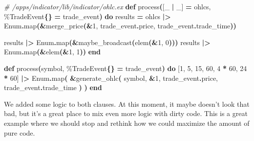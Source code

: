 \documentclass[
  oneside]{book}
\newenvironment{Shaded}{\begin{snugshade}}{\end{snugshade}}
\newcommand{\CommentTok}[1]{\textcolor[rgb]{0.56,0.35,0.01}{\textit{#1}}}
\newcommand{\ConstantTok}[1]{\textcolor[rgb]{0.56,0.35,0.01}{#1}}
\newcommand{\DecValTok}[1]{\textcolor[rgb]{0.00,0.00,0.81}{#1}}
\newcommand{\FunctionTok}[1]{\textcolor[rgb]{0.13,0.29,0.53}{\textbf{#1}}}
\newcommand{\KeywordTok}[1]{\textcolor[rgb]{0.13,0.29,0.53}{\textbf{#1}}}
\newcommand{\NormalTok}[1]{#1}
\newcommand{\OperatorTok}[1]{\textcolor[rgb]{0.81,0.36,0.00}{\textbf{#1}}}
\newcommand{\OtherTok}[1]{\textcolor[rgb]{0.56,0.35,0.01}{#1}}
\begin{document}
\begin{Shaded}
\begin{Highlighting}[]
\CommentTok{\# /apps/indicator/lib/indicator/ohlc.ex}
  \KeywordTok{def}\NormalTok{ process}\FunctionTok{(}\OtherTok{[}\NormalTok{\_ }\OperatorTok{|}\NormalTok{ \_}\OtherTok{]} \OperatorTok{=}\NormalTok{ ohlcs, \%}\ConstantTok{TradeEvent}\FunctionTok{\{\}} \OperatorTok{=}\NormalTok{ trade\_event}\FunctionTok{)} \KeywordTok{do}
\NormalTok{    results }\OperatorTok{=}
\NormalTok{      ohlcs}
      \OperatorTok{|\textgreater{}} \ConstantTok{Enum}\OperatorTok{.}\NormalTok{map}\FunctionTok{(}\OperatorTok{\&}\NormalTok{merge\_price}\FunctionTok{(}\OperatorTok{\&}\DecValTok{1}\NormalTok{, trade\_event}\OperatorTok{.}\NormalTok{price, trade\_event}\OperatorTok{.}\NormalTok{trade\_time}\FunctionTok{))}

\NormalTok{    results }\OperatorTok{|\textgreater{}} \ConstantTok{Enum}\OperatorTok{.}\NormalTok{map}\FunctionTok{(}\OperatorTok{\&}\NormalTok{maybe\_broadcast}\FunctionTok{(}\NormalTok{elem}\FunctionTok{(}\OperatorTok{\&}\DecValTok{1}\NormalTok{, }\DecValTok{0}\FunctionTok{)))}
\NormalTok{    results }\OperatorTok{|\textgreater{}} \ConstantTok{Enum}\OperatorTok{.}\NormalTok{map}\FunctionTok{(}\OperatorTok{\&}\NormalTok{elem}\FunctionTok{(}\OperatorTok{\&}\DecValTok{1}\NormalTok{, }\DecValTok{1}\FunctionTok{))}
  \KeywordTok{end}

  \KeywordTok{def}\NormalTok{ process}\FunctionTok{(}\NormalTok{symbol, \%}\ConstantTok{TradeEvent}\FunctionTok{\{\}} \OperatorTok{=}\NormalTok{ trade\_event}\FunctionTok{)} \KeywordTok{do}
    \OtherTok{[}\DecValTok{1}\NormalTok{, }\DecValTok{5}\NormalTok{, }\DecValTok{15}\NormalTok{, }\DecValTok{60}\NormalTok{, }\DecValTok{4} \OperatorTok{*} \DecValTok{60}\NormalTok{, }\DecValTok{24} \OperatorTok{*} \DecValTok{60}\OtherTok{]}
    \OperatorTok{|\textgreater{}} \ConstantTok{Enum}\OperatorTok{.}\NormalTok{map}\FunctionTok{(}
      \OperatorTok{\&}\NormalTok{generate\_ohlc}\FunctionTok{(}
\NormalTok{        symbol,}
        \OperatorTok{\&}\DecValTok{1}\NormalTok{,}
\NormalTok{        trade\_event}\OperatorTok{.}\NormalTok{price,}
\NormalTok{        trade\_event}\OperatorTok{.}\NormalTok{trade\_time}
      \FunctionTok{)}
    \FunctionTok{)}
  \KeywordTok{end}
\end{Highlighting}
\end{Shaded}

We added some logic to both clauses. At this moment, it maybe doesn't look that bad, but it's a great place to mix even more logic with dirty code. This is a great example where we should stop and rethink how we could maximize the amount of pure code.
\end{document}

